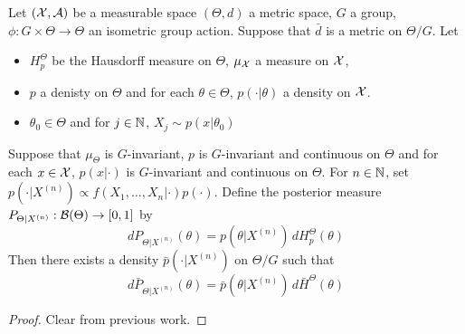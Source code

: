 \documentclass{book}
\begin{document}
	\begin{ex}
	Let $(\mathcal{X}, \mathcal{A})$ be a measurable space $(\Theta, d)$ a metric space, $G$ a group, $\phi: G \times \Theta \rightarrow \Theta$ an isometric group action. Suppose that $\bar{d}$ is a metric on $\Theta / G$. Let 
	\begin{itemize}
	\item $H_p^{\Theta}$ be the Hausdorff measure on $\Theta$, $\mu_{\mathcal{X}}$ a measure on $\mathcal{X}$, 
	\item $p$ a denisty on $\Theta$ and for each $\theta \in \Theta$, $p(\cdot|\theta)$ a density on $\mathcal{X}$. 
	\item $\theta_0 \in \Theta$ and for $j \in \mathbb{N}$, $X_j \sim p(x|\theta_0)$
	\end{itemize}
	Suppose that $\mu_{\Theta}$ is $G$-invariant, $p$ is $G$-invariant and continuous on $\Theta$ and for each $x \in \mathcal{X}$, $p(x| \cdot)$ is $G$-invariant and continuous on $\Theta$. For $n \in \mathbb{N}$, set $p(\cdot|X^{(n)}) \propto f(X_1, \ldots, X_n| \cdot) p(\cdot)$. Define the posterior measure $P_{\Theta|X^{(n)}}: \mathcal{B}(\Theta) \rightarrow [0, 1]$ by 
	\begin{equation*}
	d P_{\Theta|X^{(n)}} (\theta) = p(\theta |X^{(n)}) \, dH_p^{\Theta} (\theta)
	\end{equation*}
	Then there exists a density $\bar{p}(\cdot|X^{(n)})$ on $\Theta / G$ such that 
	\begin{equation*}
	d \bar{P}_{\Theta|X^{(n)}}(\theta) = \bar{p}(\theta |X^{(n)}) \, d\bar{H}^{\Theta} (\theta)
	\end{equation*}
	\end{ex}
	
	\begin{proof}
	Clear from previous work.
	\end{proof}
	
\end{document}
